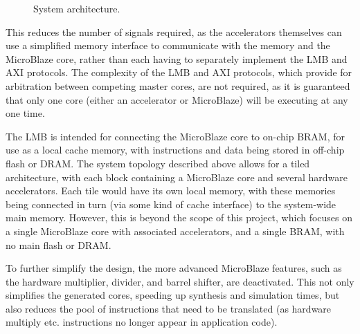 \documentclass{UoYCSproject}
\begin{document}
\begin{figure}[H]
\caption{System architecture.}
\label{fig:systemArchitecture}
\end{figure}

This reduces the number of signals required, as the accelerators themselves can use a simplified memory interface to communicate
with the memory and the MicroBlaze core, rather than each having to separately implement the LMB and AXI protocols.
The complexity of the LMB and AXI protocols, which provide for arbitration between competing master cores, are not required,
as it is guaranteed that only one core (either an accelerator or MicroBlaze) will be executing at any one time.

The LMB is intended for connecting the MicroBlaze core to on-chip BRAM, for use as a local cache memory, with instructions
and data being stored in off-chip flash or DRAM. The system topology described above allows for a tiled architecture,
with each block containing a MicroBlaze core and several hardware accelerators. Each tile would have its own local memory,
with these memories being connected in turn (via some kind of cache interface) to the system-wide main memory. However,
this is beyond the scope of this project, which focuses on a single MicroBlaze core with associated accelerators,
and a single BRAM, with no main flash or DRAM.

To further simplify the design, the more advanced MicroBlaze features, such as the hardware multiplier, divider, and barrel
shifter, are deactivated. This not only simplifies the generated cores, speeding up synthesis and simulation times, but also
reduces the pool of instructions that need to be translated (as hardware multiply etc. instructions no longer appear in
application code).
\end{document}
